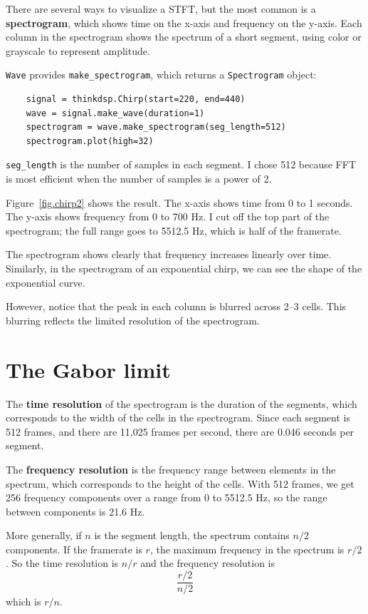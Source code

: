 \documentclass[12pt]{book}
\begin{document}
There are several ways to visualize a STFT, but the most common
is a {\bf spectrogram}, which shows time on the x-axis and frequency
on the y-axis.  Each column in the spectrogram shows the spectrum of
a short segment, using color or grayscale to represent amplitude.

{\tt Wave} provides \verb"make_spectrogram", which returns a
{\tt Spectrogram} object:

\begin{verbatim}
    signal = thinkdsp.Chirp(start=220, end=440)
    wave = signal.make_wave(duration=1)
    spectrogram = wave.make_spectrogram(seg_length=512)
    spectrogram.plot(high=32)
\end{verbatim}

\verb"seg_length" is the number of samples in each segment.  I chose
512 because FFT is most efficient when the number of samples is a
power of 2.

Figure~\ref{fig.chirp2} shows the result.  The x-axis shows time from
0 to 1 seconds.  The y-axis shows frequency from 0 to 700 Hz.  I cut
off the top part of the spectrogram; the full range goes to 5512.5 Hz,
which is half of the framerate.

The spectrogram shows clearly that frequency increases linearly
over time.  Similarly, in the spectrogram of an exponential chirp, we
can see the shape of the exponential curve.

However, notice that the peak in each column is blurred across 2--3
cells.  This blurring reflects the limited resolution of the
spectrogram.


\section{The Gabor limit}
\label{gabor}

The {\bf time resolution} of the spectrogram is the duration of the
segments, which corresponds to the width of the cells in the
spectrogram.  Since each segment is 512 frames, and there are 11,025
frames per second, there are 0.046 seconds per segment.

The {\bf frequency resolution} is the frequency range between
elements in the spectrum, which corresponds to the height of the
cells.  With 512 frames, we get 256 frequency components over a range
from 0 to 5512.5 Hz, so the range between components is 21.6 Hz.

More generally, if $n$ is the segment length, the spectrum contains
$n/2$ components.  If the framerate is $r$, the maximum frequency in
the spectrum is $r/2$.  So the time resolution is $n/r$ and the
frequency resolution is
%
\[ \frac{r/2}{n/2} \]
%
which is $r/n$.
\end{document}
